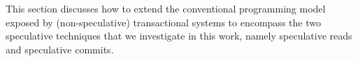 %

This section discusses how to extend the conventional programming model exposed by (non-speculative) transactional systems to encompass the two speculative techniques that we investigate in this work, namely speculative reads and speculative commits.

